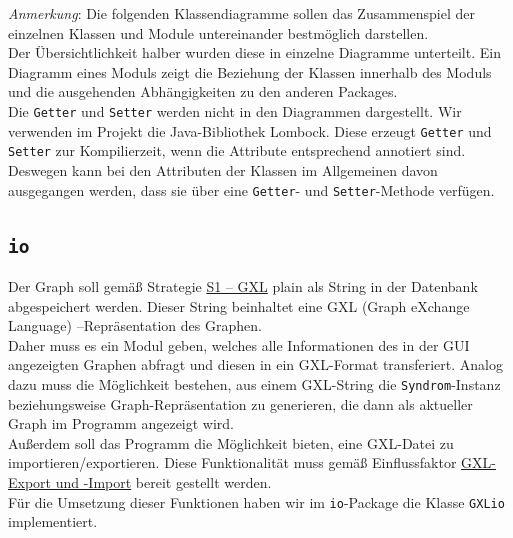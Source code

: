 \documentclass[enabledeprecatedfontcommands,fontsize=11pt,paper=a4,twoside]{scrartcl}
\newcounter{one}
\begin{document}
	
	
	\textit{Anmerkung}:
	Die folgenden Klassendiagramme sollen das Zusammenspiel der einzelnen Klassen und Module untereinander bestmöglich darstellen. \\
	Der Übersichtlichkeit halber wurden diese in einzelne Diagramme unterteilt. Ein Diagramm eines Moduls zeigt die Beziehung der Klassen innerhalb des Moduls und die ausgehenden Abhängigkeiten zu den anderen Packages. \\
	Die \texttt{Getter} und \texttt{Setter} werden nicht in den Diagrammen dargestellt. Wir verwenden im Projekt die Java-Bibliothek Lombock. Diese erzeugt \texttt{Getter} und \texttt{Setter} zur Kompilierzeit, wenn die Attribute entsprechend annotiert sind. Deswegen kann bei den Attributen der Klassen im Allgemeinen davon ausgegangen werden, dass sie über eine \texttt{Getter}- und \texttt{Setter}-Methode verfügen.\\
	
	\subsection{\texttt{io}}
	Der Graph soll gemäß Strategie \hyperlink{yy}{S1 – GXL} \glqq plain\grqq{} als String in der Datenbank abgespeichert werden. Dieser String beinhaltet eine GXL (Graph eXchange Language) –Repräsentation des Graphen.\\
	Daher muss es ein Modul geben, welches alle Informationen des in der GUI angezeigten Graphen abfragt und diesen in ein GXL-Format transferiert. Analog dazu muss die Möglichkeit bestehen, aus einem GXL-String die \texttt{Syndrom}-Instanz beziehungsweise Graph-Repräsentation zu generieren, die dann als aktueller Graph im Programm angezeigt wird.\\ 
	
	Außerdem soll das Programm die Möglichkeit bieten, eine GXL-Datei zu importieren/exportieren. Diese Funktionalität muss gemäß Einflussfaktor \hyperlink{ii}{GXL- Export und -Import} bereit gestellt werden.\\ 
	Für die Umsetzung dieser Funktionen haben wir im \texttt{io}-Package die Klasse \texttt{GXLio} implementiert. \\
	
\end{document}
